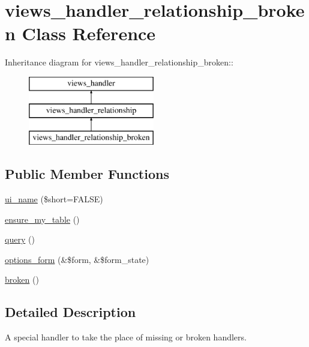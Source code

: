 \hypertarget{classviews__handler__relationship__broken}{
\section{views\_\-handler\_\-relationship\_\-broken Class Reference}
\label{classviews__handler__relationship__broken}
}
Inheritance diagram for views\_\-handler\_\-relationship\_\-broken::\begin{figure}[H]
\begin{center}
\leavevmode
\includegraphics[height=3cm]{classviews__handler__relationship__broken}
\end{center}
\end{figure}
\subsection*{Public Member Functions}
\begin{DoxyCompactItemize}
\item 
\hyperlink{classviews__handler__relationship__broken_ad6a2ac8a5183f5293745ce27b55ac390}{ui\_\-name} (\$short=FALSE)
\item 
\hyperlink{classviews__handler__relationship__broken_acea2731924b5f5e3b83776f237b3ff67}{ensure\_\-my\_\-table} ()
\item 
\hyperlink{classviews__handler__relationship__broken_a58db24781460cd5b36c08c56df9d56ab}{query} ()
\item 
\hyperlink{classviews__handler__relationship__broken_aa421a42866d049732e8747669466ae0e}{options\_\-form} (\&\$form, \&\$form\_\-state)
\item 
\hyperlink{classviews__handler__relationship__broken_ac4e5826e70953e7ec16f50ec264fdb53}{broken} ()
\end{DoxyCompactItemize}


\subsection{Detailed Description}
A special handler to take the place of missing or broken handlers. 

